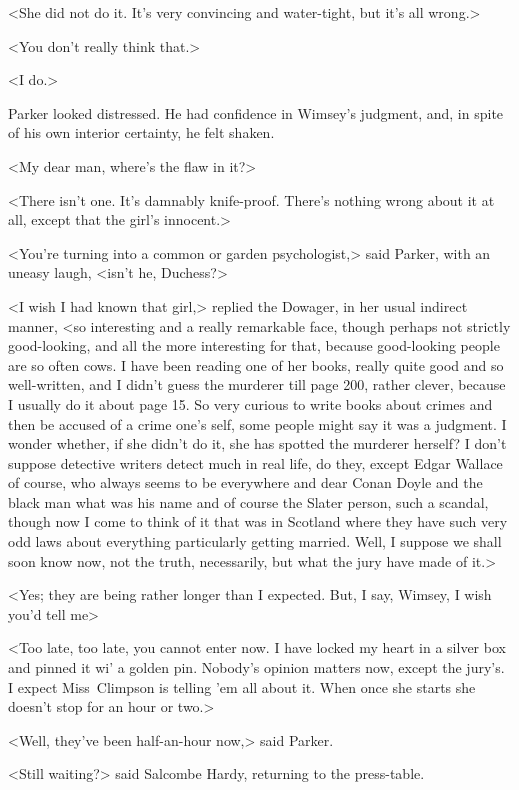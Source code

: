 <She did not do it. It's very convincing and water-tight, but it's all wrong.>

<You don't really think that.>

<I do.>

Parker looked distressed. He had confidence in Wimsey's judgment, and, in spite of his own interior certainty, he felt shaken.

<My dear man, where's the flaw in it?>

<There isn't one. It's damnably knife-proof. There's nothing wrong about it at all, except that the girl's innocent.>

<You're turning into a common or garden psychologist,> said Parker, with an uneasy laugh, <isn't he, Duchess?>

<I wish I had known that girl,> replied the Dowager, in her usual indirect manner, <so interesting and a really remarkable face, though perhaps not strictly good-looking, and all the more interesting for that, because good-looking people are so often cows. I have been reading one of her books, really quite good and so well-written, and I didn't guess the murderer till page 200, rather clever, because I usually do it about page 15. So very curious to write books about crimes and then be accused of a crime one's self, some people might say it was a judgment. I wonder whether, if she didn't do it, she has spotted the murderer herself? I don't suppose detective writers detect much in real life, do they, except Edgar Wallace of course, who always seems to be everywhere and dear Conan Doyle and the black man what was his name and of course the Slater person, such a scandal, though now I come to think of it that was in Scotland where they have such very odd laws about everything particularly getting married. Well, I suppose we shall soon know now, not the truth, necessarily, but what the jury have made of it.>

<Yes; they are being rather longer than I expected. But, I say, Wimsey, I wish you'd tell me\longdash>

<Too late, too late, you cannot enter now. I have locked my heart in a silver box and pinned it wi' a golden pin. Nobody's opinion matters now, except the jury's. I expect Miss~Climpson is telling 'em all about it. When once she starts she doesn't stop for an hour or two.>

<Well, they've been half-an-hour now,> said Parker.

<Still waiting?> said Salcombe Hardy, returning to the press-table.

